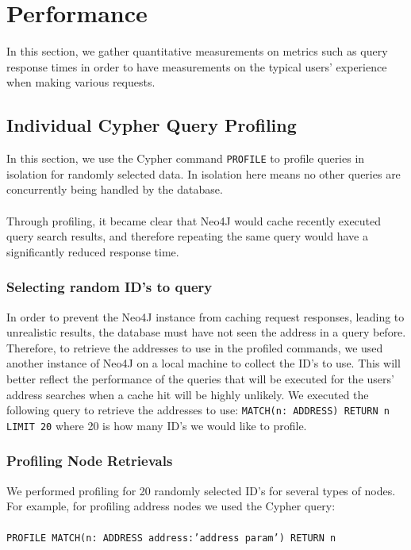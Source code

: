 \section{Performance} 
In this section, we gather quantitative measurements on metrics such as query response times in order to have measurements on the typical users' experience when making various requests. 

\subsection{Individual Cypher Query Profiling}
In this section, we use the Cypher command \texttt{PROFILE} to profile queries in isolation for randomly selected data. In isolation here means no other queries are concurrently being handled by the database.
\\\\
Through profiling, it became clear that Neo4J would cache recently executed query search results, and therefore repeating the same query would have a significantly reduced response time. 

\subsubsection{Selecting random ID's to query}
In order to prevent the Neo4J instance from caching request responses, leading to unrealistic results, the database must have not seen the address in a query before. Therefore, to retrieve the addresses to use in the profiled commands, we used another instance of Neo4J on a local machine to collect the ID's to use. This will better reflect the performance of the queries that will be executed for the users' address searches when a cache hit will be highly unlikely. We executed the following query to retrieve the addresses to use: \texttt{MATCH(n: ADDRESS) RETURN n LIMIT 20} where 20 is how many ID's we would like to profile. 

\subsubsection{Profiling Node Retrievals}
We performed profiling for 20 randomly selected ID's for several types of nodes. For example, for profiling address nodes we used the Cypher query:
\\\\
\texttt{PROFILE MATCH(n: ADDRESS {address:'{address param}'}) RETURN n}

